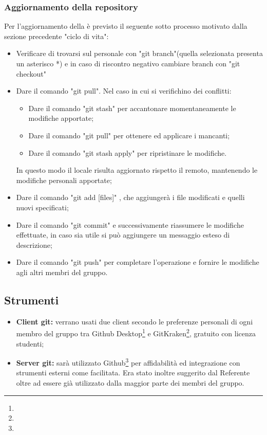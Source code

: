 \documentclass[NormeDiProgetto.tex]{subfiles}
\begin{document}
	\subsubsection{Aggiornamento della repository}
	Per l'aggiornamento della  è previsto il seguente sotto processo motivato dalla sezione precedente "ciclo di vita":
	\begin{itemize}
		\item Verificare di trovarsi sul  personale con "git branch"(quella selezionata presenta un asterisco *) e in caso di riscontro negativo cambiare branch con "git checkout"
		\item Dare il comando "git pull". Nel caso in cui si verifichino dei conflitti:
		\begin{itemize}
			\item Dare il comando "git stash" per accantonare momentaneamente	le modifiche apportate;
			\item Dare il comando "git pull" per ottenere ed applicare i  mancanti;
			\item Dare il comando "git stash apply" per ripristinare le modifiche.
		\end{itemize}
		In questo modo il  locale risulta aggiornato rispetto il  remoto, mantenendo le modifiche personali apportate;
	
		\item Dare il comando "git add [files]" , che aggiungerà i file modificati e quelli nuovi specificati;
		\item Dare il comando "git commit" e successivamente riassumere le modifiche effettuate, in caso sia utile si può aggiungere un messaggio esteso di descrizione;
		\item Dare il comando "git push" per completare l'operazione e fornire le modifiche agli altri membri del gruppo.
	\end{itemize}
	\subsection{Strumenti}
	\begin{itemize}
		\item \textbf{Client git:} verrano usati due client secondo le preferenze personali di ogni membro del gruppo tra Github Desktop\footnote{} e GitKraken\footnote{}, gratuito con licenza studenti;
		\item \textbf{Server git:} sarà utilizzato Github\footnote{} per affidabilità ed integrazione con strumenti esterni come  facilitata. Era stato inoltre suggerito dal Referente oltre ad essere già utilizzato dalla maggior parte dei membri del gruppo.
	\end{itemize}
\end{document}
